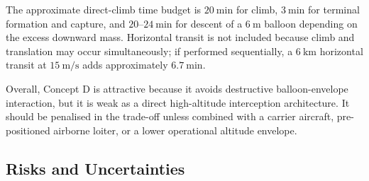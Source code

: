 The approximate direct-climb time budget is \(20~\mathrm{min}\) for climb, \(3~\mathrm{min}\) for terminal formation and capture, and \(20\)--\(24~\mathrm{min}\) for descent of a \(6~\mathrm{m}\) balloon depending on the excess downward mass. Horizontal transit is not included because climb and translation may occur simultaneously; if performed sequentially, a \(6~\mathrm{km}\) horizontal transit at \(15~\mathrm{m/s}\) adds approximately \(6.7~\mathrm{min}\).

Overall, Concept D is attractive because it avoids destructive balloon-envelope interaction, but it is weak as a direct high-altitude interception architecture. It should be penalised in the trade-off unless combined with a carrier aircraft, pre-positioned airborne loiter, or a lower operational altitude envelope.










\subsection{Risks and Uncertainties}

